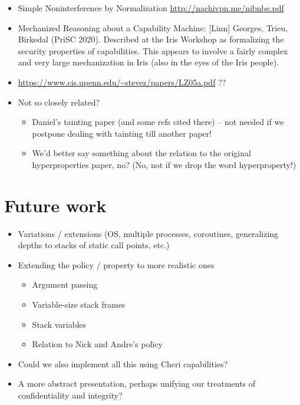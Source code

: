 \documentclass[conference]{IEEEtran}
\begin{document}
\begin{itemize}
\item Simple Noninterference by Normalization \url{http://nachivpn.me/nibnbe.pdf}

\item Mechanized Reasoning about a Capability Machine: [Linn] Georges,
Trieu, Birkedal (PriSC 2020).
%
Described at the Iris Workshop as formalizing the security properties of
capabilities. This appears to involve a fairly complex and very large
mechanization in Iris (also in the eyes of the Iris people).



\item \url{https://www.cis.upenn.edu/~stevez/papers/LZ05a.pdf} ??

\item Not so closely related?
\begin{itemize}
\item Daniel's tainting paper (and some refs cited there)
      \cite{DBLP:conf/eurosp/SchoepeBPS16} -- not needed if we postpone
      dealing with tainting till another paper!
\item We'd better say something about the relation to the original
hyperproperties paper, no?  (No, not if we drop the word hyperproperty!)
\end{itemize}
\end{itemize}

\iftext
\section{Future work}

\begin{itemize}
\item Variations / extensions (OS, multiple processes, coroutines, generalizing depths to stacks of static call points, etc.)
\item Extending the policy / property to more realistic ones
\begin{itemize}
\item Argument passing
\item Variable-size stack frames
\item Stack variables
\item Relation to Nick and Andre’s policy
\end{itemize}
\item Could we also implement all this using Cheri capabilities?
\item A more abstract presentation, perhaps unifying our treatments of
confidentiality and integrity?
\end{itemize}
\end{document}
